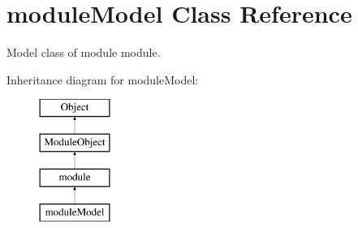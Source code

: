 \hypertarget{classmoduleModel}{\section{module\+Model Class Reference}
\label{classmoduleModel}
}


Model class of module module.  


Inheritance diagram for module\+Model\+:\begin{figure}[H]
\begin{center}
\leavevmode
\includegraphics[height=4.000000cm]{classmoduleModel}
\end{center}
\end{figure}
